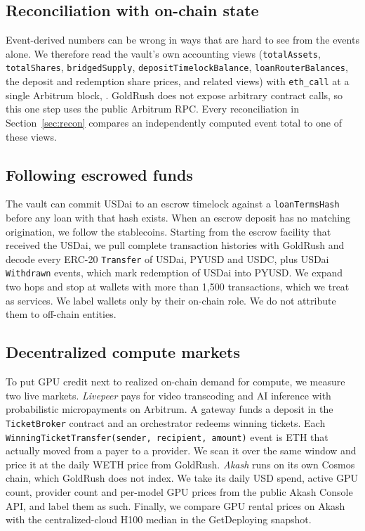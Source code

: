 \subsection{Reconciliation with on-chain state}
Event-derived numbers can be wrong in ways that are hard to see from the events alone. We therefore read the vault's own accounting views (\texttt{totalAssets}, \texttt{totalShares}, \texttt{bridgedSupply}, \texttt{depositTimelockBalance}, \texttt{loanRouterBalances}, the deposit and redemption share prices, and related views) with \texttt{eth\_call} at a single Arbitrum block, \StateBlock{}. GoldRush does not expose arbitrary contract calls, so this one step uses the public Arbitrum RPC. Every reconciliation in Section~\ref{sec:recon} compares an independently computed event total to one of these views.

\subsection{Following escrowed funds}
The vault can commit USDai to an escrow timelock against a \texttt{loanTermsHash} before any loan with that hash exists. When an escrow deposit has no matching origination, we follow the stablecoins. Starting from the escrow facility that received the USDai, we pull complete transaction histories with GoldRush and decode every ERC-20 \texttt{Transfer} of USDai, PYUSD and USDC, plus USDai \texttt{Withdrawn} events, which mark redemption of USDai into PYUSD. We expand two hops and stop at wallets with more than 1{,}500 transactions, which we treat as services. We label wallets only by their on-chain role. We do not attribute them to off-chain entities.

\subsection{Decentralized compute markets}
To put GPU credit next to realized on-chain demand for compute, we measure two live markets. \emph{Livepeer} pays for video transcoding and AI inference with probabilistic micropayments on Arbitrum. A gateway funds a deposit in the \texttt{TicketBroker} contract and an orchestrator redeems winning tickets. Each \texttt{WinningTicketTransfer(sender, recipient, amount)} event is ETH that actually moved from a payer to a provider. We scan it over the same window and price it at the daily WETH price from GoldRush. \emph{Akash} runs on its own Cosmos chain, which GoldRush does not index. We take its daily USD spend, active GPU count, provider count and per-model GPU prices from the public Akash Console API, and label them as such. Finally, we compare GPU rental prices on Akash with the centralized-cloud H100 median in the GetDeploying snapshot.

